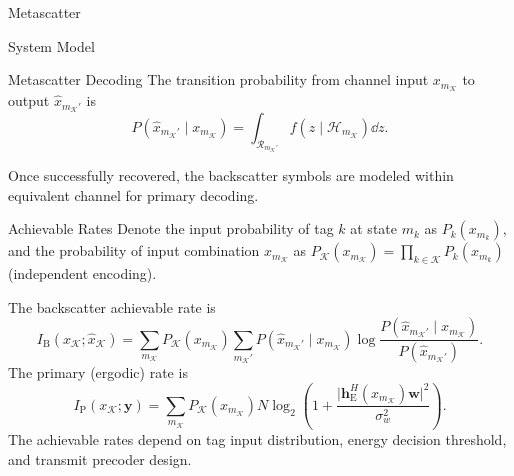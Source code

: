 \documentclass[9pt]{beamer}
\begin{document}
\begin{section}{Metascatter}
\begin{subsection}{System Model}
			\begin{frame}{Metascatter Decoding}
				The transition probability from channel input $x_{m_{\mathcal{K}}}$ to output $\hat{x}_{m_{\mathcal{K}}'}$ is
				\begin{equation}
					P(\hat{x}_{m_{\mathcal{K}}'} \mid x_{m_{\mathcal{K}}}) = \int_{\mathcal{R}_{m_{\mathcal{K}}'}} f(z \mid \mathcal{H}_{m_{\mathcal{K}}}) \dd z.
					\label{eq:dtmac}
				\end{equation}

				\vspace{1em}
				Once successfully recovered, the backscatter symbols are \alert{modeled within} equivalent channel for primary decoding.
			\end{frame}

			\begin{frame}{Achievable Rates}
				Denote the input probability of tag $k$ at state $m_k$ as $P_k(x_{m_k})$, and the probability of input combination $x_{m_{\mathcal{K}}}$ as $P_{\mathcal{K}}(x_{m_{\mathcal{K}}}) = \prod_{k \in \mathcal{K}} P_k(x_{m_k})$ (independent encoding).

				\vspace{1em}
				The backscatter achievable rate is
				\begin{equation}
					I_{\mathrm{B}}(x_{\mathcal{K}};\hat{x}_{\mathcal{K}}) = \sum_{m_{\mathcal{K}}} P_{\mathcal{K}}(x_{m_{\mathcal{K}}}) \sum_{m_{\mathcal{K}}'} P(\hat{x}_{m_{\mathcal{K}}'} \mid x_{m_{\mathcal{K}}}) \log \frac{P(\hat{x}_{m_{\mathcal{K}}'} \mid x_{m_{\mathcal{K}}})}{P(\hat{x}_{m_{\mathcal{K}}'})}.
					\label{eq:backscatter_mutual_information}
				\end{equation}
				The primary (ergodic) rate is
				\begin{equation}
					I_{\mathrm{P}}(x_{\mathcal{K}};\boldsymbol{y}) = \sum_{m_{\mathcal{K}}} P_{\mathcal{K}}(x_{m_{\mathcal{K}}}) N \log_2 \left(1 + \frac{\lvert \boldsymbol{h}_{\mathrm{E}}^H(x_{m_{\mathcal{K}}}) \boldsymbol{w} \rvert^2}{\sigma_w^2}\right).
					\label{eq:primary_mutual_information}
				\end{equation}
				The achievable rates depend on \alert{tag input distribution, energy decision threshold, and transmit precoder design.}
			\end{frame}
		\end{subsection}


\end{section}
\end{document}

